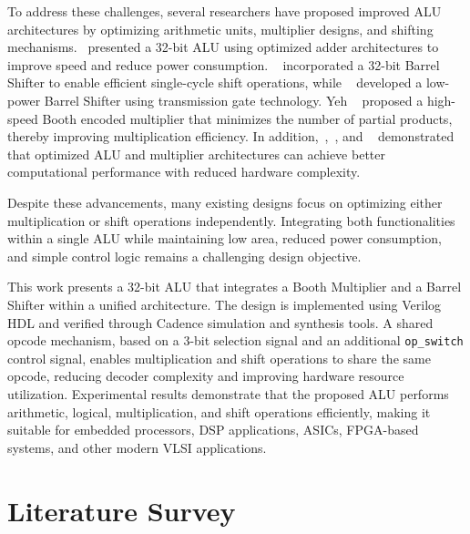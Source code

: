 \documentclass[conference]{IEEEtran}
\begin{document}
To address these challenges, several researchers have proposed improved ALU architectures by optimizing arithmetic units, multiplier designs, and shifting mechanisms.~\cite{ref1} presented a 32-bit ALU using optimized adder architectures to improve speed and reduce power consumption. ~\cite{ref2} incorporated a 32-bit Barrel Shifter to enable efficient single-cycle shift operations, while ~\cite{ref3} developed a low-power Barrel Shifter using transmission gate technology. Yeh ~\cite{ref4} proposed a high-speed Booth encoded multiplier that minimizes the number of partial products, thereby improving multiplication efficiency. In addition,~\cite{ref5},~\cite{ref6}, and ~\cite{ref7} demonstrated that optimized ALU and multiplier architectures can achieve better computational performance with reduced hardware complexity.

Despite these advancements, many existing designs focus on optimizing either multiplication or shift operations independently. Integrating both functionalities within a single ALU while maintaining low area, reduced power consumption, and simple control logic remains a challenging design objective.

This work presents a 32-bit ALU that integrates a Booth Multiplier and a Barrel Shifter within a unified architecture. The design is implemented using Verilog HDL and verified through Cadence simulation and synthesis tools. A shared opcode mechanism, based on a 3-bit selection signal and an additional \texttt{op\_switch} control signal, enables multiplication and shift operations to share the same opcode, reducing decoder complexity and improving hardware resource utilization. Experimental results demonstrate that the proposed ALU performs arithmetic, logical, multiplication, and shift operations efficiently, making it suitable for embedded processors, DSP applications, ASICs, FPGA-based systems, and other modern VLSI applications.

\section{Literature Survey}
\end{document}

